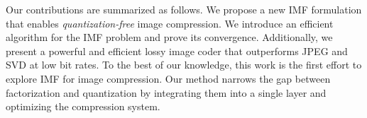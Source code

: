Our contributions are summarized as follows. We propose a new IMF formulation that enables \emph{quantization-free} image compression. We introduce an efficient algorithm for the IMF problem and prove its convergence. Additionally, we present a powerful and efficient lossy image coder that outperforms JPEG and SVD at low bit rates. To the best of our knowledge, this work is the first effort to explore IMF for image compression. Our method narrows the gap between factorization and quantization by integrating them into a single layer and optimizing the compression system.
